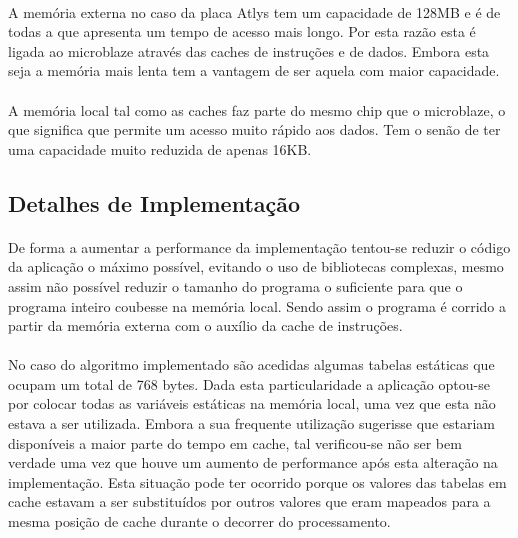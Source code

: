 \paragraph{} A memória externa no caso da placa Atlys tem um capacidade de 128MB e é de todas a que apresenta um tempo de acesso mais longo. Por esta razão esta é ligada ao microblaze através das caches de instruções e de dados. Embora esta seja a memória mais lenta tem a vantagem de ser aquela com maior capacidade.

\paragraph{} A memória local tal como as caches faz parte do mesmo chip que o microblaze, o que significa que permite um acesso muito rápido aos dados. Tem o senão de ter uma capacidade muito reduzida de apenas 16KB.

\subsection{Detalhes de Implementação}

\paragraph{} De forma a aumentar a performance da implementação tentou-se reduzir o código da aplicação o máximo possível, evitando o uso de bibliotecas complexas, mesmo assim não possível reduzir o tamanho do programa o suficiente para que o programa inteiro coubesse na memória local. Sendo assim o programa é corrido a partir da memória externa com o auxílio da cache de instruções.

\paragraph{} No caso do algoritmo implementado são acedidas algumas tabelas estáticas que ocupam um total de 768 bytes. Dada esta particularidade a aplicação optou-se por colocar todas as variáveis estáticas na memória local, uma vez que esta não estava a ser utilizada. Embora a sua frequente utilização sugerisse que estariam disponíveis a maior parte do tempo em cache, tal verificou-se não ser bem verdade uma vez que houve um aumento de performance após esta alteração na implementação. Esta situação pode ter ocorrido porque os valores das tabelas em cache estavam a ser substituídos por outros valores que eram mapeados para a mesma posição de cache durante o decorrer do processamento.

